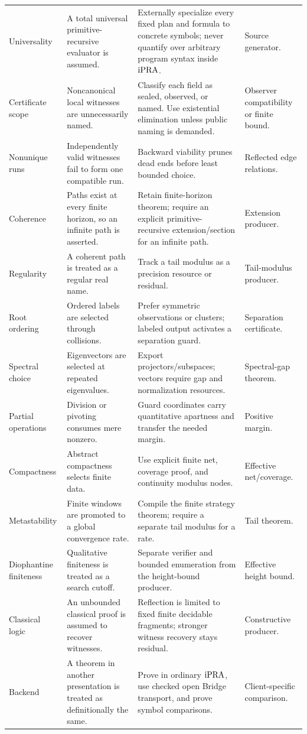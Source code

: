 \begin{longtable}{@{}p{}p{}p{}p{}@{}}
\addlinespace
Universality & A total universal primitive-recursive evaluator is assumed. &
Externally specialize every fixed plan and formula to concrete symbols; never
quantify over arbitrary program syntax inside \(\mathrm{iPRA}\). & Source generator. \\
\addlinespace
Certificate scope & Noncanonical local witnesses are unnecessarily named. &
Classify each field as sealed, observed, or named.  Use existential elimination
unless public naming is demanded. & Observer compatibility or finite bound. \\
\addlinespace
Nonunique runs & Independently valid witnesses fail to form one compatible
run. & Backward viability prunes dead ends before least bounded choice. &
Reflected edge relations. \\
\addlinespace
Coherence & Paths exist at every finite horizon, so an infinite path is
asserted. & Retain finite-horizon theorem; require an explicit primitive-
recursive extension/section for an infinite path. & Extension producer. \\
\addlinespace
Regularity & A coherent path is treated as a regular real name. & Track a tail
modulus as a precision resource or residual. & Tail-modulus producer. \\
\addlinespace
Root ordering & Ordered labels are selected through collisions. & Prefer
symmetric observations or clusters; labeled output activates a separation
guard. & Separation certificate. \\
\addlinespace
Spectral choice & Eigenvectors are selected at repeated eigenvalues. & Export
projectors/subspaces; vectors require gap and normalization resources. &
Spectral-gap theorem. \\
\addlinespace
Partial operations & Division or pivoting consumes mere nonzero. & Guard
coordinates carry quantitative apartness and transfer the needed margin. &
Positive margin. \\
\addlinespace
Compactness & Abstract compactness selects finite data. & Use explicit finite
net, coverage proof, and continuity modulus nodes. & Effective net/coverage. \\
\addlinespace
Metastability & Finite windows are promoted to a global convergence rate. &
Compile the finite strategy theorem; require a separate tail modulus for a
rate. & Tail theorem. \\
\addlinespace
Diophantine finiteness & Qualitative finiteness is treated as a search cutoff.
& Separate verifier and bounded enumeration from the height-bound producer. &
Effective height bound. \\
\addlinespace
Classical logic & An unbounded classical proof is assumed to recover
witnesses. & Reflection is limited to fixed finite decidable fragments;
stronger witness recovery stays residual. & Constructive producer. \\
\addlinespace
Backend & A theorem in another presentation is treated as definitionally the
same. & Prove in ordinary \(\mathrm{iPRA}\), use checked open Bridge transport, and
prove symbol comparisons. & Client-specific comparison. \\
\bottomrule
\end{longtable}

